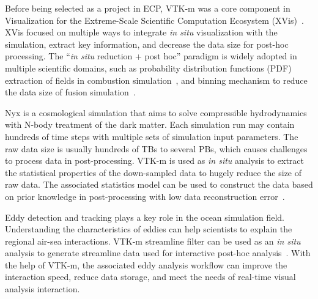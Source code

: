 Before being selected as a project in ECP, VTK-m was a core component in Visualization for the Extreme-Scale Scientific Computation Ecosystem (XVis)~\cite{Moreland2019}. 
XVis focused on multiple ways to integrate \emph{in situ} visualization with the simulation, extract key information, and decrease the data size for post-hoc processing.
The ``\emph{in situ} reduction + post hoc'' paradigm is widely adopted in multiple scientific domains, such as probability distribution functions (PDF) extraction of fields in combustion simulation~\cite{7874311}, and binning mechanism to reduce the data size of fusion simulation~\cite{Kress2018}. 


Nyx is a cosmological simulation that aims to solve compressible hydrodynamics with N-body treatment of the dark matter. Each simulation run may contain hundreds of time steps with multiple sets of simulation input parameters. The raw data size is usually hundreds of TBs to several PBs, which causes challenges to process data in post-processing. 
VTK-m is used as \emph{in situ} analysis to extract the statistical properties of the down-sampled data to hugely reduce the size of raw data. The associated statistics model can be used to construct the data based on prior knowledge in post-processing with low data reconstruction error~\cite{Wang2019}.

Eddy detection and tracking plays a key role in the ocean simulation field. Understanding the characteristics of eddies can help scientists to explain the regional air-sea interactions.
VTK-m streamline filter can be used as an \emph{in situ} analysis to generate streamline data used for interactive post-hoc analysis~\cite{Han2022}. With the help of VTK-m, the associated eddy analysis workflow can improve the interaction speed, reduce data storage, and meet the
needs of real-time visual analysis interaction.  
